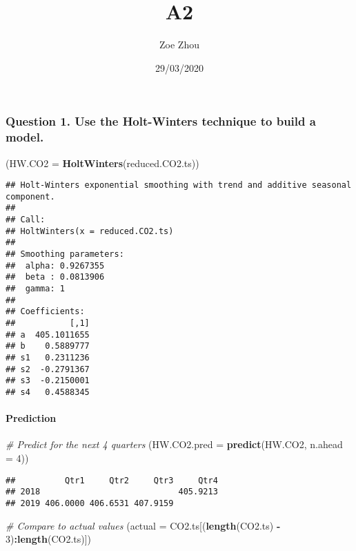 \documentclass[]{article}
\title{A2}
\author{Zoe Zhou}
\date{29/03/2020}
\newenvironment{Shaded}{\begin{snugshade}}{\end{snugshade}}
\newcommand{\CommentTok}[1]{\textcolor[rgb]{0.56,0.35,0.01}{\textit{#1}}}
\newcommand{\DataTypeTok}[1]{\textcolor[rgb]{0.13,0.29,0.53}{#1}}
\newcommand{\DecValTok}[1]{\textcolor[rgb]{0.00,0.00,0.81}{#1}}
\newcommand{\KeywordTok}[1]{\textcolor[rgb]{0.13,0.29,0.53}{\textbf{#1}}}
\newcommand{\NormalTok}[1]{#1}
\newcommand{\OperatorTok}[1]{\textcolor[rgb]{0.81,0.36,0.00}{\textbf{#1}}}
\newcommand{\StringTok}[1]{\textcolor[rgb]{0.31,0.60,0.02}{#1}}
\let\oldparagraph\paragraph
\renewcommand{\paragraph}[1]{\oldparagraph{#1}\mbox{}}
\begin{document}
\maketitle

\hypertarget{question-1.-use-the-holt-winters-technique-to-build-a-model.}{%
\subsubsection{Question 1. Use the Holt-Winters technique to build a
model.}\label{question-1.-use-the-holt-winters-technique-to-build-a-model.}}

\begin{Shaded}
\begin{Highlighting}[]
\NormalTok{(}\DataTypeTok{HW.CO2 =} \KeywordTok{HoltWinters}\NormalTok{(reduced.CO2.ts))}
\end{Highlighting}
\end{Shaded}

\begin{verbatim}
## Holt-Winters exponential smoothing with trend and additive seasonal component.
## 
## Call:
## HoltWinters(x = reduced.CO2.ts)
## 
## Smoothing parameters:
##  alpha: 0.9267355
##  beta : 0.0813906
##  gamma: 1
## 
## Coefficients:
##           [,1]
## a  405.1011655
## b    0.5889777
## s1   0.2311236
## s2  -0.2791367
## s3  -0.2150001
## s4   0.4588345
\end{verbatim}

\hypertarget{prediction}{%
\paragraph{Prediction}\label{prediction}}

\begin{Shaded}
\begin{Highlighting}[]
\CommentTok{# Predict for the next 4 quarters}
\NormalTok{(}\DataTypeTok{HW.CO2.pred =} \KeywordTok{predict}\NormalTok{(HW.CO2, }\DataTypeTok{n.ahead =} \DecValTok{4}\NormalTok{))}
\end{Highlighting}
\end{Shaded}

\begin{verbatim}
##          Qtr1     Qtr2     Qtr3     Qtr4
## 2018                            405.9213
## 2019 406.0000 406.6531 407.9159
\end{verbatim}

\begin{Shaded}
\begin{Highlighting}[]
\CommentTok{# Compare to actual values}
\NormalTok{(}\DataTypeTok{actual =}\NormalTok{ CO2.ts[(}\KeywordTok{length}\NormalTok{(CO2.ts) }\OperatorTok{-}\StringTok{ }\DecValTok{3}\NormalTok{)}\OperatorTok{:}\KeywordTok{length}\NormalTok{(CO2.ts)])}
\end{Highlighting}
\end{Shaded}
\end{document}
